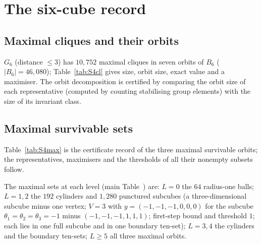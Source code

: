\section{The six-cube record}\label{S:six}

\subsection{Maximal cliques and their orbits}
$G_6$ (distance $\le3$) has $10{,}752$ maximal cliques in seven orbits of $B_6$ ($|B_6|=46{,}080$); Table~\ref{tab:S4cl} gives size, orbit size, exact value and a maximiser. The orbit decomposition is certified by comparing the orbit size of each representative (computed by counting stabilising group elements) with the size of its invariant class.
\begin{table}[H]\centering\small
\caption{Maximal cliques of $G_6$ by orbit (main Theorem~).}\label{tab:S4cl}

\end{table}

\subsection{Maximal survivable sets}
Table~\ref{tab:S4max} is the certificate record of the three maximal survivable orbits; the representatives, maximisers and the thresholds of all their nonempty subsets follow.
\begin{table}[H]\centering\small
\caption{Six-cube maximal survivable orbits with certificates; the last column counts the nonempty subsets of the representative with $V=\tfrac52$ exactly.}\label{tab:S4max}

\end{table}

\medskip
The maximal sets at each level (main Table~) are: $L=0$ the $64$ radius-one balls; $L=1,2$ the $192$ cylinders and $1{,}280$ punctured subcubes (a three-dimensional subcube minus one vertex; $V=3$ with $y=(-1,-1,-1,0,0,0)$ for the subcube $\theta_1=\theta_2=\theta_3=-1$ minus $(-1,-1,-1,1,1,1)$; first-step bound and threshold $1$; each lies in one full subcube and in one boundary ten-set); $L=3,4$ the cylinders and the boundary ten-sets; $L\ge5$ all three maximal orbits.

